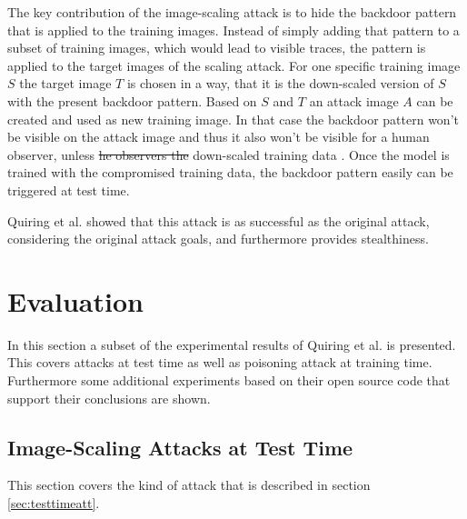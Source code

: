 \documentclass[sigconf]{acmart}
\providecommand{\DIFadd}[1]{{\protect\color{blue}\uwave{#1}}} %
\providecommand{\DIFdel}[1]{{\protect\color{red}\sout{#1}}}                      %
\providecommand{\DIFaddbegin}{} %
\providecommand{\DIFaddend}{} %
\providecommand{\DIFdelbegin}{} %
\providecommand{\DIFdelend}{} %
\begin{document}
The key contribution of the image-scaling attack is to hide the backdoor pattern that is applied to the training images.
Instead of simply adding that pattern to a subset of training images, which would lead to visible traces, the pattern is applied to the target images of the scaling attack.
For one specific training image $S$ the target image $T$ is chosen in a way, that it is the down-scaled version of $S$ with the present backdoor pattern.
Based on $S$ and $T$ an attack image $A$ can be created and used as new training image.
In that case the backdoor pattern won't be visible on the attack image and thus it also won't be visible for a human observer, unless \DIFdelbegin \DIFdel{he observers the }\DIFdelend \DIFaddbegin \DIFadd{the the }\DIFaddend down-scaled training data \DIFaddbegin \DIFadd{is observed}\DIFaddend .
Once the model is trained with the compromised training data, the backdoor pattern easily can be triggered at test time.

Quiring et al. showed that this attack is as successful as the original attack, considering the original attack goals, and furthermore provides stealthiness.

\section{Evaluation}
In this section a subset of the experimental results of Quiring et al.\cite{imgscale, imgscalepoison} is presented.
This covers attacks at test time as well as poisoning attack at training time.
Furthermore some additional experiments based on their open source code that support their conclusions are shown.

\subsection{Image-Scaling Attacks at Test Time}
This section covers the kind of attack that is described in section \ref{sec:testtimeatt}.
\end{document}
